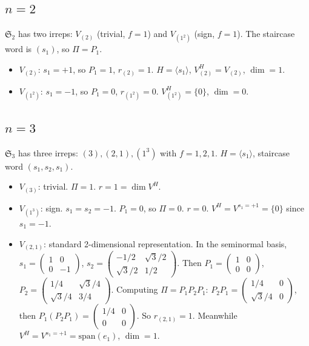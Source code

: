\documentclass[11pt]{article}
\theoremstyle{definition}
\theoremstyle{remark}
\newcommand{\Sym}{\mathfrak{S}}
\begin{document}
\subsection{$n = 2$}

$\Sym_2$ has two irreps: $V_{(2)}$ (trivial, $f = 1$) and $V_{(1^2)}$
(sign, $f = 1$). The staircase word is $(s_1)$, so $\Pi = P_1$.
\begin{itemize}
  \item $V_{(2)}$: $s_1 = +1$, so $P_1 = 1$, $r_{(2)} = 1$.
    $H = \langle s_1 \rangle$, $V_{(2)}^H = V_{(2)}$, $\dim = 1$. \checkmark
  \item $V_{(1^2)}$: $s_1 = -1$, so $P_1 = 0$, $r_{(1^2)} = 0$.
    $V_{(1^2)}^H = \{0\}$, $\dim = 0$. \checkmark
\end{itemize}


\subsection{$n = 3$}

$\Sym_3$ has three irreps: $(3), (2,1), (1^3)$ with $f = 1, 2, 1$.
$H = \langle s_1 \rangle$, staircase word $(s_1, s_2, s_1)$.

\begin{itemize}
  \item $V_{(3)}$: trivial. $\Pi = 1$. $r = 1 = \dim V^H$. \checkmark
  \item $V_{(1^3)}$: sign. $s_1 = s_2 = -1$. $P_1 = 0$, so $\Pi = 0$.
    $r = 0$. $V^H = V^{s_1=+1} = \{0\}$ since $s_1 = -1$. \checkmark
  \item $V_{(2,1)}$: standard 2-dimensional representation. In the
    seminormal basis, $s_1 = \begin{pmatrix} 1 & 0 \\ 0 & -1\end{pmatrix}$,
    $s_2 = \begin{pmatrix} -1/2 & \sqrt{3}/2 \\ \sqrt{3}/2 & 1/2\end{pmatrix}$.
    Then $P_1 = \begin{pmatrix} 1 & 0 \\ 0 & 0\end{pmatrix}$,
    $P_2 = \begin{pmatrix} 1/4 & \sqrt{3}/4 \\ \sqrt{3}/4 & 3/4\end{pmatrix}$.
    Computing $\Pi = P_1 P_2 P_1$: $P_2 P_1 = \begin{pmatrix} 1/4 & 0 \\
    \sqrt{3}/4 & 0\end{pmatrix}$, then $P_1(P_2 P_1) = \begin{pmatrix}
    1/4 & 0 \\ 0 & 0\end{pmatrix}$.
    So $r_{(2,1)} = 1$. Meanwhile $V^H = V^{s_1=+1} = \mathrm{span}(e_1)$,
    $\dim = 1$. \checkmark
\end{itemize}
\end{document}
